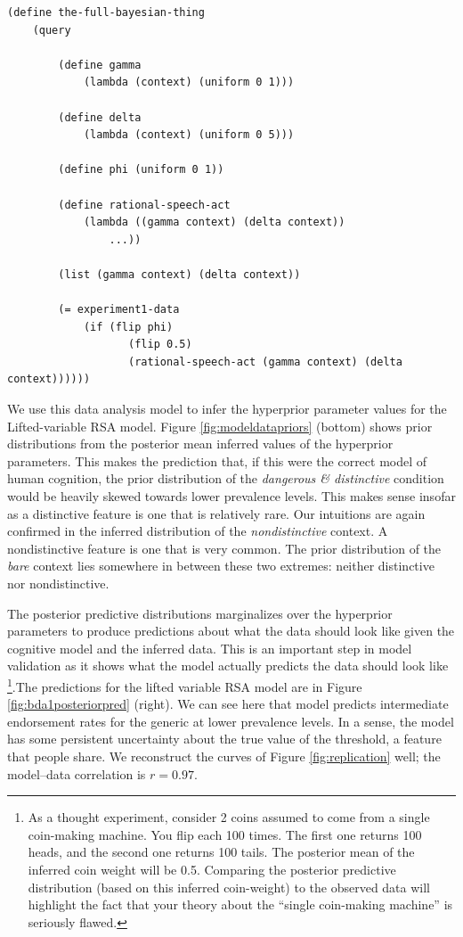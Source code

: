 \documentclass[10pt,letterpaper]{article}
\begin{document}
\begin{lstlisting}
(define the-full-bayesian-thing
	(query
	
		(define gamma
			(lambda (context) (uniform 0 1)))
			
		(define delta
			(lambda (context) (uniform 0 5)))
			
		(define phi (uniform 0 1))
	
		(define rational-speech-act
			(lambda ((gamma context) (delta context)) 
				...))
				
		(list (gamma context) (delta context))
				
		(= experiment1-data 
			(if (flip phi)
				   (flip 0.5)
				   (rational-speech-act (gamma context) (delta context))))))
\end{lstlisting}


We use this data analysis model to infer the hyperprior parameter values for the Lifted-variable RSA model. Figure \ref{fig:modeldatapriors} (bottom) shows prior distributions from the posterior mean inferred values of the hyperprior parameters. This makes the prediction that, if this were the correct model of human cognition, the prior distribution of the \emph{dangerous \& distinctive} condition would be heavily skewed towards lower prevalence levels. This makes sense insofar as a distinctive feature is one that is relatively rare. Our intuitions are again confirmed in the inferred distribution of the \emph{nondistinctive} context. A nondistinctive feature is one that is very common. The prior distribution of the \emph{bare} context lies somewhere in between these two extremes: neither distinctive nor nondistinctive.

The posterior predictive distributions marginalizes over the hyperprior parameters to produce predictions about what the data should look like given the cognitive model and the inferred data. This is an important step in model validation as it shows what the model actually predicts the data should look like \footnote{As a thought experiment, consider 2 coins assumed to come from a single coin-making machine. You flip each 100 times. The first one returns 100 heads, and the second one returns 100 tails. The posterior mean of the inferred coin weight will be 0.5. Comparing the posterior predictive distribution (based on this inferred coin-weight) to the observed data will highlight the fact that your theory about the ``single coin-making machine'' is seriously flawed.}.The predictions for the lifted variable RSA model are in Figure \ref{fig:bda1posteriorpred} (right). We can see here that model predicts intermediate endorsement rates for the generic at lower prevalence levels. In a sense, the model has some persistent uncertainty about the true value of the threshold, a feature that people share. We reconstruct the curves of Figure \ref{fig:replication} well; the model--data correlation is $r = 0.97$.
\end{document}
